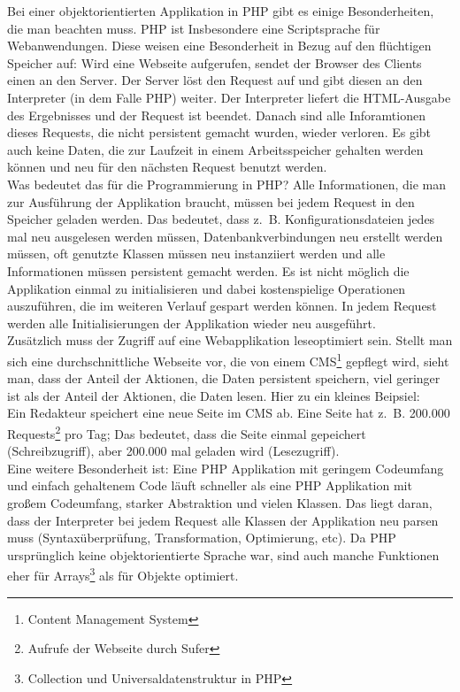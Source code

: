 Bei einer objektorientierten Applikation in PHP gibt es einige Besonderheiten, die man beachten muss. PHP ist Insbesondere eine Scriptsprache für Webanwendungen. Diese weisen eine Besonderheit in Bezug auf den flüchtigen Speicher auf: Wird eine Webseite aufgerufen, sendet der Browser des Clients einen  an den Server. Der Server löst den Request auf und gibt diesen an den Interpreter (in dem Falle PHP) weiter. Der Interpreter liefert die HTML-Ausgabe des Ergebnisses und der Request ist beendet. Danach sind alle Inforamtionen dieses Requests, die nicht persistent gemacht wurden, wieder verloren. Es gibt auch keine Daten, die zur Laufzeit in einem Arbeitsspeicher gehalten werden können und neu für den nächsten Request benutzt werden.\\
Was bedeutet das für die Programmierung in PHP? Alle Informationen, die man zur Ausführung der Applikation braucht, müssen bei jedem Request in den Speicher geladen werden. Das bedeutet, dass z.~B. Konfigurationsdateien jedes mal neu ausgelesen werden müssen, Datenbankverbindungen neu erstellt werden müssen, oft genutzte Klassen müssen neu instanziiert werden und alle Informationen müssen persistent gemacht werden. Es ist nicht möglich die Applikation einmal zu initialisieren und dabei kostenspielige Operationen auszuführen, die im weiteren Verlauf gespart werden können. In jedem Request werden alle Initialisierungen der Applikation wieder neu ausgeführt. \\
Zusätzlich muss der Zugriff auf eine Webapplikation leseoptimiert sein. Stellt man sich eine durchschnittliche Webseite vor, die von einem CMS\footnote{Content Management System} gepflegt wird, sieht man, dass der Anteil der Aktionen, die Daten persistent speichern, viel geringer ist als der Anteil der Aktionen, die Daten lesen. Hier zu ein kleines Beipsiel:\\
Ein Redakteur speichert eine neue Seite im CMS ab. Eine Seite hat z.~B. 200.000 Requests\footnote{Aufrufe der Webseite durch Sufer} pro Tag; Das bedeutet, dass die Seite einmal gepeichert (Schreibzugriff), aber 200.000 mal geladen wird (Lesezugriff). \\
Eine weitere Besonderheit ist: Eine PHP Applikation mit geringem Codeumfang und einfach gehaltenem Code läuft schneller als eine PHP Applikation mit großem Codeumfang, starker Abstraktion und vielen Klassen. Das liegt daran, dass der Interpreter bei jedem Request alle Klassen der Applikation neu parsen muss (Syntaxüberprüfung, Transformation, Optimierung, etc). Da PHP ursprünglich keine objektorientierte Sprache war, sind auch manche Funktionen eher für Arrays\footnote{Collection und Universaldatenstruktur in PHP} als für Objekte optimiert. \\
